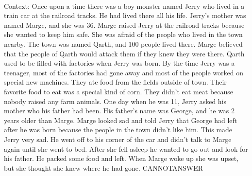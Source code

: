 \documentclass[11pt,a4paper, onecolumn]{article}
\begin{document}
\\ Context: Once upon a time there was a boy monster named Jerry who lived in a train car at the railroad tracks. He had lived there all his life. Jerry's mother was named Marge, and she was 36. Marge raised Jerry at the railroad tracks because she wanted to keep him safe. She was afraid of the people who lived in the town nearby. The town was named Qarth, and 100 people lived there. Marge believed that the people of Qarth would attack them if they knew they were there. Qarth used to be filled with factories when Jerry was born. By the time Jerry was a teenager, most of the factories had gone away and most of the people worked on special new machines. They ate food from the fields outside of town. Their favorite food to eat was a special kind of corn. They didn't eat meat because nobody raised any farm animals. One day when he was 11, Jerry asked his mother who his father had been. His father's name was George, and he was 2 years older than Marge. Marge looked sad and told Jerry that George had left after he was born because the people in the town didn't like him. This made Jerry very sad. He went off to his corner of the car and didn't talk to Marge again until she went to bed. After she fell asleep he wanted to go out and look for his father. He packed some food and left. When Marge woke up she was upset, but she thought she knew where he had gone. CANNOTANSWER
\end{document}
